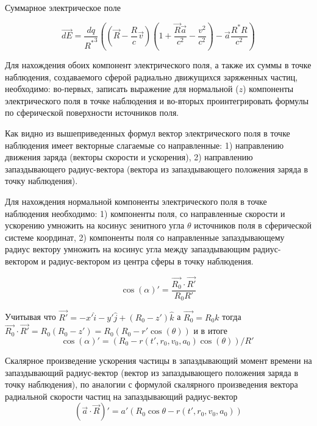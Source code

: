 ﻿\documentclass[12pt, letterpaper]{article}
\begin{document}
Суммарное электрическое поле

$$\vec{dE} = \frac{dq}{{{R}^{*}}^{3}}\left( \left(\vec{R}-\frac{R}{c}\vec{v} \right) \left(1 + \frac{\vec{R}\vec{a}}{c^2} - \frac{v^2}{c^2} \right) - \vec{a}\frac{{R}^{*}R}{c^2} \right)$$


Для нахождения обоих компонент электрического поля, а также их суммы в точке наблюдения, создаваемого сферой радиально движущихся заряженных частиц, необходимо: во-первых, записать выражение для нормальной ($z$) компоненты электрического поля в точке наблюдения и во-вторых проинтегрировать формулы по сферической поверхности источников поля.

Как видно из вышеприведенных формул вектор электрического поля в точке наблюдения имеет векторные слагаемые со направленные: 1) направлению движения заряда (векторы скорости и ускорения), 2) направлению запаздывающего радиус-вектора (вектора из запаздывающего положения заряда в точку наблюдения).

Для нахождения нормальной компоненты электрического поля в точке наблюдения необходимо: 1) компоненты поля, со направленные скорости и ускорению умножить на косинус зенитного угла $\theta$ источников поля в сферической системе координат, 2) компоненты поля со направленные запаздывающему радиус вектору умножить на косинус угла между запаздывающим радиус-вектором и радиус-вектором из центра сферы в точку наблюдения.

 $$\cos \left( \alpha  \right)'=\frac{\overrightarrow{{{R}_{0}}}\cdot \overrightarrow{R'}}{{{R}_{0}}R'}$$

Учитывая что $\overrightarrow{R'}=-x'\widehat{i}-y'\widehat{j}+\left( {{R}_{0}}-z' \right)\widehat{k}$ а  $\overrightarrow{{{R}_{0}}}={{R}_{0}}\widehat{k}$ тогда $\overrightarrow{{{R}_{0}}}\cdot \overrightarrow{R'}={{R}_{0}}\left( {{R}_{0}}-z' \right)={{R}_{0}}\left( {{R}_{0}}-r'\cos \left( \theta  \right) \right)$ и в итоге
	$$\cos \left( \alpha  \right)'={\left( {{R}_{0}}-r\left( t',{{r}_{0}},{{v}_{0}},{{a}_{0}} \right)\cos \left( \theta  \right) \right)}/{R'}\;$$

Скалярное произведение ускорения частицы в запаздывающий момент времени на запаздывающий радиус-вектор (вектор из запаздывающего положения заряда в точку наблюдения), по аналогии с формулой скалярного произведения вектора радиальной скорости частиц на запаздывающий радиус-вектор
	\[\left( \overrightarrow{a}\cdot \overrightarrow{R} \right)'=a'\left( {{R}_{0}}\cos \theta -r\left( t',{{r}_{0}},{{v}_{0}},{{a}_{0}} \right) \right)\] 	
\end{document}
